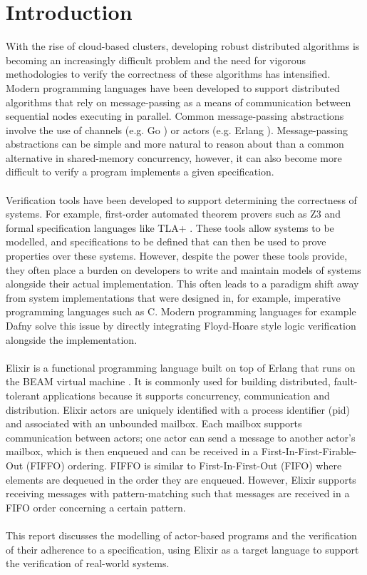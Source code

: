 \chapter{Introduction}
With the rise of cloud-based clusters, developing robust distributed algorithms is becoming an increasingly difficult problem and the need for vigorous methodologies to verify the correctness of these algorithms has intensified. Modern programming languages have been developed to support distributed algorithms that rely on message-passing as a means of communication between sequential nodes executing in parallel. Common message-passing abstractions involve the use of channels (e.g. Go \cite{go}) or actors \cite{actor} (e.g. Erlang \cite{erlang}). Message-passing abstractions can be simple and more natural to reason about than a common alternative in shared-memory concurrency, however, it can also become more difficult to verify a program implements a given specification.
\\ \\
Verification tools have been developed to support determining the correctness of systems. For example, first-order automated theorem provers such as Z3 \cite{z3} and formal specification languages like TLA+ \cite{tlaplus}. These tools allow systems to be modelled, and specifications to be defined that can then be used to prove properties over these systems. However, despite the power these tools provide, they often place a burden on developers to write and maintain models of systems alongside their actual implementation. This often leads to a paradigm shift away from system implementations that were designed in, for example, imperative programming languages such as C. Modern programming languages for example Dafny \cite{dafny} solve this issue by directly integrating Floyd-Hoare style logic verification alongside the implementation.
\\ \\
Elixir \cite{elixir} is a functional programming language built on top of Erlang that runs on the BEAM virtual machine \cite{beam}. It is commonly used for building distributed, fault-tolerant applications because it supports concurrency, communication and distribution. Elixir actors are uniquely identified with a process identifier (pid) and associated with an unbounded mailbox. Each mailbox supports communication between actors; one actor can send a message to another actor's mailbox, which is then enqueued and can be received in a First-In-First-Firable-Out (FIFFO) ordering. FIFFO is similar to First-In-First-Out (FIFO) where elements are dequeued in the order they are enqueued. However, Elixir supports receiving messages with pattern-matching such that messages are received in a FIFO order concerning a certain pattern.
\\ \\
This report discusses the modelling of actor-based programs and the verification of their adherence to a specification, using Elixir as a target language to support the verification of real-world systems.
